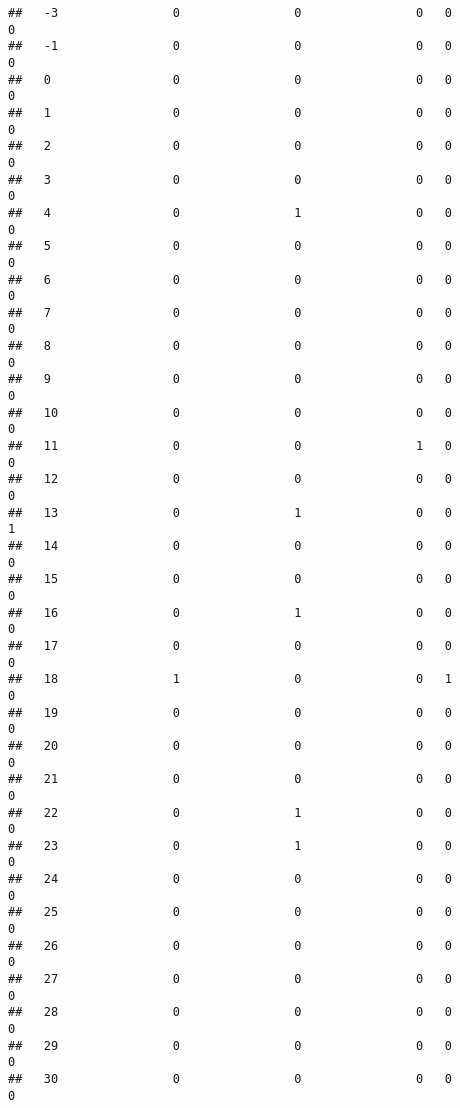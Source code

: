 \documentclass[]{article}
\begin{document}
\begin{verbatim}
##   -3                0                0                0   0                0
##   -1                0                0                0   0                0
##   0                 0                0                0   0                0
##   1                 0                0                0   0                0
##   2                 0                0                0   0                0
##   3                 0                0                0   0                0
##   4                 0                1                0   0                0
##   5                 0                0                0   0                0
##   6                 0                0                0   0                0
##   7                 0                0                0   0                0
##   8                 0                0                0   0                0
##   9                 0                0                0   0                0
##   10                0                0                0   0                0
##   11                0                0                1   0                0
##   12                0                0                0   0                0
##   13                0                1                0   0                1
##   14                0                0                0   0                0
##   15                0                0                0   0                0
##   16                0                1                0   0                0
##   17                0                0                0   0                0
##   18                1                0                0   1                0
##   19                0                0                0   0                0
##   20                0                0                0   0                0
##   21                0                0                0   0                0
##   22                0                1                0   0                0
##   23                0                1                0   0                0
##   24                0                0                0   0                0
##   25                0                0                0   0                0
##   26                0                0                0   0                0
##   27                0                0                0   0                0
##   28                0                0                0   0                0
##   29                0                0                0   0                0
##   30                0                0                0   0                0

\end{verbatim}
\end{document}
